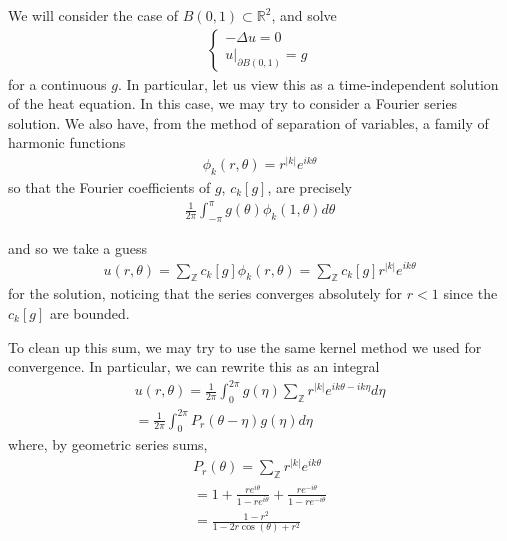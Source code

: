 \documentclass{article}
\newcommand{\R}{{\mathbb{R}}}
\newcommand{\Z}{{\mathbb{Z}}}
\newcommand{\pd}{\partial}
\begin{document}
	
	We will consider the case of $B(0,1) \subset \R^{2}$, and solve 
	\begin{align*}
		\begin{cases}
			-\Delta u = 0 \\
			u|_{\pd B(0,1)} = g 
		\end{cases}
	\end{align*}
	for a continuous $g$. In particular, let us view this as a time-independent solution of the heat equation. In this case, we may try to consider a Fourier series solution. We also have, from the method of separation of variables, a family of harmonic functions 
	\begin{align*}
		\phi_{k}(r,\theta) = r^{|k|} e^{ik\theta}
	\end{align*}
	so that the Fourier coefficients of $g$, $c_{k}[g]$, are precisely 
	\begin{align*}
		\frac{1}{2\pi} \int_{-\pi}^{\pi} g(\theta) \phi_{k}(1,\theta) d\theta
	\end{align*}
	
	and so we take a guess 
	\begin{align*}
		u(r,\theta) = \sum_{\Z} c_{k}[g] \phi_{k}(r,\theta) = \sum_{\Z} c_{k}[g] r^{|k|}e^{ik\theta}
	\end{align*}
	for the solution, noticing that the series converges absolutely for $r<1$ since the $c_{k}[g]$ are bounded. 
	
	To clean up this sum, we may try to use the same kernel method we used for convergence. In particular, we can rewrite this as an integral
	\begin{align*}
		u(r,\theta) = \frac{1}{2\pi} \int_{0}^{2\pi}g(\eta) \sum_{\Z} r^{|k|}e^{ik\theta - ik\eta} d\eta \\
		=\frac{1}{2\pi} \int_{0}^{2\pi} P_{r}(\theta - \eta) g(\eta) d\eta
	\end{align*}
	where, by geometric series sums, 
	\begin{align*}
		P_{r}(\theta) = \sum_{\Z} r^{|k|}e^{ik\theta} \\
		= 1 + \frac{re^{i\theta}}{1-re^{i\theta}} + \frac{re^{-i\theta}}{1-re^{-i\theta}} \\
		= \frac{1-r^{2}}{1-2r\cos(\theta) + r^{2}}
	\end{align*}
	
\end{document}
